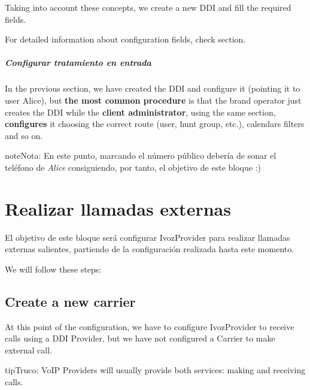 \documentclass[letterpaper,10pt,spanish]{sphinxmanual}
\begin{document}
Taking into account these concepts, we create a new DDI and fill the required
fields.

For detailed information about configuration fields, check {\hyperref[administration_portal/client/vpbx/ddis:pbx\string-ddis]{}} section.
\paragraph{Configurar tratamiento en entrada}

In the previous section, we have created the DDI and configure it (pointing it to user Alice),
but \textbf{the most common procedure} is that the brand operator just creates the DDI while the
\textbf{client administrator}, using the same section, \textbf{configures} it choosing
the correct route (user, hunt group, etc.), calendars filters and so on.

\begin{notice}{note}{Nota:}
En este punto, marcando el número público debería de sonar el teléfono de \emph{Alice} consiguiendo, por tanto, el objetivo de este bloque :)
\end{notice}


\chapter{Realizar llamadas externas}
\label{getting_started/external_outgoing_calls/index:making-external-calls}\label{getting_started/external_outgoing_calls/index::doc}
El objetivo de este bloque será configurar IvozProvider para realizar llamadas externas salientes, partiendo de la configuración realizada hasta este momento.

We will follow these steps:


\section{Create a new carrier}
\label{getting_started/external_outgoing_calls/create_carrier:create-a-new-carrier}\label{getting_started/external_outgoing_calls/create_carrier::doc}
At this point of the configuration, we have to configure IvozProvider to receive
calls using a DDI Provider, but we have not configured a Carrier to make external call.

\begin{notice}{tip}{Truco:}
VoIP Providers will usually provide both services: making and receiving calls.
\end{notice}
\end{document}
